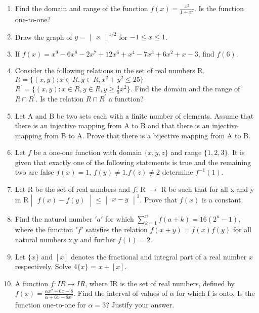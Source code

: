 \begin{enumerate}[label=\arabic*.,ref=\thesubsection.\theenumi]
\item Find the domain and range of the function $f(x)=\frac{x^2}{1+x^2}.$ Is the function one-to-one?

\item Draw the graph of $y = \begin{vmatrix} x \end{vmatrix}^{1/2}$ for $-1 \leq x \leq 1$.

\item If $f(x)=x^{9}-6x^{8}-2x^{7}+12x^{6}+x^{4}-7x^{3}+6x^{2}+x-3$, find $f(6)$.

\item Consider the following relations in the set of real numbers R. $R = \{(x,y);x \in R, y\in R, x^2+y^2 \leq 25\}$\\
$R^{'} = \{(x,y):x \in R, y \in R, y \geq \frac{4}{9}x^2\}$. Find the domain and the range of $R \cap R^{'}$. Is the relation $R \cap R^{'}$ a function?

\item Let A and B be two sets each with a finite number of elements. Assume that there is an injective mapping from A to B and that there is an injective mapping from B to A. Prove that there is a bijective mapping from A to B.

\item Let $f$ be a one-one function with domain $\{x,y,z\}$ and range $\{1,2,3\}$. It is given that exactly one of the following statements is true and the remaining two are false $f(x)=1$, $f(y) \neq 1$,$f(z) \neq 2$ determine $f^{-1}(1)$. 
 
\item Let R be the set of real numbers and $f$: R $\rightarrow$ R be such that for all x and y in R$\begin{vmatrix} f(x)-f(y) \end{vmatrix} \leq \begin{vmatrix} x-y \end{vmatrix}^3$. Prove that $f(x)$ is a constant.

\item Find the natural number $'a'$ for which $\sum_{k=1}^{n} f(a+k) = 16(2^n-1)$, where the function $'f'$ satisfies the relation $f(x+y)=f(x)f(y)$ for all natural numbers x,y and further $f(1)=2$.

\item Let $\{x\}$ and $[x]$ denotes the fractional and integral part of a real number $x$ respectively. Solve 4$\{x\}$ = $x+[x]$.

\item A function $f: IR \rightarrow IR$, where IR is the set of real numbers, defined by $f(x)=\frac{\alpha x^{2}+6x-8}{\alpha+6x-8x^{2}}$. Find the interval of values of $\alpha$ for which f is onto. Is the function one-to-one for $\alpha = 3$? Justify your answer.


\end{enumerate}
